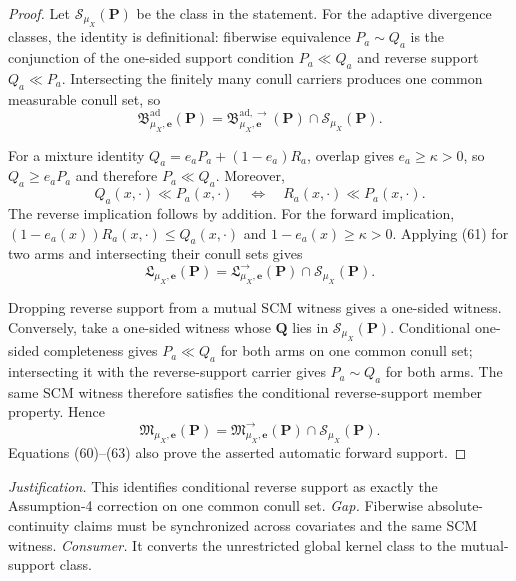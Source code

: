 \documentclass{article}
\begin{document}
\begin{proof}
Let \(\mathcal S_{\mu_X}(\boldsymbol P)\) be the class in the statement.  For the adaptive divergence classes, the identity is definitional: fiberwise equivalence \(P_a\sim Q_a\) is the conjunction of the one-sided support condition \(P_a\ll Q_a\) and reverse support \(Q_a\ll P_a\).  Intersecting the finitely many conull carriers produces one common measurable conull set, so
\[
 \mathfrak B^{\mathrm{ad}}_{\mu_X,\boldsymbol e}(\boldsymbol P)
 =\mathfrak B^{\mathrm{ad},\to}_{\mu_X,\boldsymbol e}(\boldsymbol P)
  \cap\mathcal S_{\mu_X}(\boldsymbol P). \tag{60}
\]

For a mixture identity \(Q_a=e_aP_a+(1-e_a)R_a\), overlap gives \(e_a\ge\kappa>0\), so \(Q_a\ge e_aP_a\) and therefore \(P_a\ll Q_a\).  Moreover,
\[
 Q_a(x,\cdot)\ll P_a(x,\cdot)
 \quad\Longleftrightarrow\quad
 R_a(x,\cdot)\ll P_a(x,\cdot). \tag{61}
\]
The reverse implication follows by addition.  For the forward implication, \((1-e_a(x))R_a(x,\cdot)\le Q_a(x,\cdot)\) and \(1-e_a(x)\ge\kappa>0\).  Applying (61) for two arms and intersecting their conull sets gives
\[
 \mathfrak L_{\mu_X,\boldsymbol e}(\boldsymbol P)
 =\mathfrak L^{\to}_{\mu_X,\boldsymbol e}(\boldsymbol P)
  \cap\mathcal S_{\mu_X}(\boldsymbol P). \tag{62}
\]

Dropping reverse support from a mutual SCM witness gives a one-sided witness.  Conversely, take a one-sided witness whose \(\boldsymbol Q\) lies in \(\mathcal S_{\mu_X}(\boldsymbol P)\).  Conditional one-sided completeness gives \(P_a\ll Q_a\) for both arms on one common conull set; intersecting it with the reverse-support carrier gives \(P_a\sim Q_a\) for both arms.  The same SCM witness therefore satisfies the conditional reverse-support member property.  Hence
\[
 \mathfrak M_{\mu_X,\boldsymbol e}(\boldsymbol P)
 =\mathfrak M^{\to}_{\mu_X,\boldsymbol e}(\boldsymbol P)
  \cap\mathcal S_{\mu_X}(\boldsymbol P). \tag{63}
\]
Equations (60)--(63) also prove the asserted automatic forward support.
\end{proof}
\par\smallskip\noindent \textit{Justification.} This identifies conditional reverse support as exactly the Assumption-4 correction on one common conull set. \textit{Gap.} Fiberwise absolute-continuity claims must be synchronized across covariates and the same SCM witness. \textit{Consumer.} It converts the unrestricted global kernel class to the mutual-support class.
\end{document}
